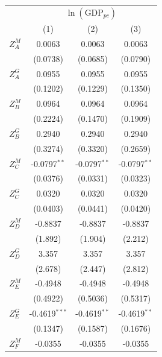 \begingroup
\centering
\begin{tabular}{lccc}
   \toprule
    & \multicolumn{3}{c}{$\ln(\text{GDP}_{pc})$}\\
                   & (1)             & (2)                & (3)\\  
   \midrule 
   $Z^{M}_A$       & 0.0063          & 0.0063             & 0.0063\\   
                   & (0.0738)        & (0.0685)           & (0.0790)\\   
   $Z^{G}_A$       & 0.0955          & 0.0955             & 0.0955\\   
                   & (0.1202)        & (0.1229)           & (0.1350)\\   
   $Z^{M}_B$       & 0.0964          & 0.0964             & 0.0964\\   
                   & (0.2224)        & (0.1470)           & (0.1909)\\   
   $Z^{G}_B$       & 0.2940          & 0.2940             & 0.2940\\   
                   & (0.3274)        & (0.3320)           & (0.2659)\\   
   $Z^{M}_C$       & -0.0797$^{**}$  & -0.0797$^{**}$     & -0.0797$^{**}$\\   
                   & (0.0376)        & (0.0331)           & (0.0323)\\   
   $Z^{G}_C$       & 0.0320          & 0.0320             & 0.0320\\   
                   & (0.0403)        & (0.0441)           & (0.0420)\\   
   $Z^{M}_D$       & -0.8837         & -0.8837            & -0.8837\\   
                   & (1.892)         & (1.904)            & (2.212)\\   
   $Z^{G}_D$       & 3.357           & 3.357              & 3.357\\   
                   & (2.678)         & (2.447)            & (2.812)\\   
   $Z^{M}_E$       & -0.4948         & -0.4948            & -0.4948\\   
                   & (0.4922)        & (0.5036)           & (0.5317)\\   
   $Z^{G}_E$       & -0.4619$^{***}$ & -0.4619$^{**}$     & -0.4619$^{**}$\\   
                   & (0.1347)        & (0.1587)           & (0.1676)\\   
   $Z^{M}_F$       & -0.0355         & -0.0355            & -0.0355\\   

\end{tabular}
